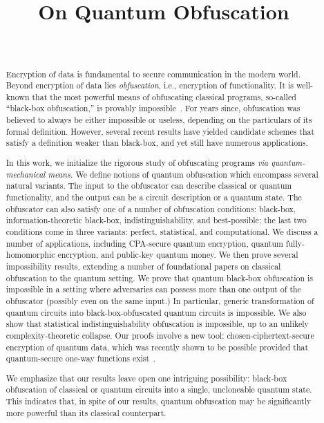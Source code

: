 \documentclass[envcountsame]{llncs}
\title{On Quantum Obfuscation}
\author{~}
\institute{~}
\numberwithin{equation}{section}
\begin{document}
\mainmatter


\maketitle
\thispagestyle{plain}

\begin{abstract}
Encryption of data is fundamental to secure communication in the modern world. Beyond encryption of data lies \emph{obfuscation}, i.e., encryption of functionality. It is well-known that the most powerful means of obfuscating classical programs, so-called ``black-box obfuscation,'' is provably impossible~\cite{BGIRSVY01}. For years since, obfuscation was believed to always be either impossible or useless, depending on the particulars of its formal definition. However, several recent results have yielded candidate schemes that satisfy a definition weaker than black-box, and yet still have numerous applications.

In this work, we initialize the rigorous study of obfuscating programs \emph{via quantum-mechanical means.} We define notions of quantum obfuscation which encompass several natural variants. The input to the obfuscator can describe classical or quantum functionality, and the output can be a circuit description or a quantum state. The obfuscator can also satisfy one of a number of obfuscation conditions: black-box, information-theoretic black-box, indistinguishability, and best-possible; the last two conditions come in three variants: perfect, statistical, and computational. We discuss a number of applications, including CPA-secure quantum encryption, quantum fully-homomorphic encryption, and public-key quantum money. We then prove several impossibility results, extending a number of foundational papers on classical obfuscation to the quantum setting. We prove that quantum black-box obfuscation is impossible in a setting where adversaries can possess more than one output of the obfuscator (possibly even on the same input.) In particular, generic transformation of quantum circuits into black-box-obfuscated quantum circuits is impossible. We also show that statistical indistinguishability obfuscation is impossible, up to an unlikely complexity-theoretic collapse. Our proofs involve a new tool: chosen-ciphertext-secure encryption of quantum data, which was recently shown to be possible provided that quantum-secure one-way functions exist~\cite{ABFGSS16}. 

We emphasize that our results leave open one intriguing possibility: black-box obfuscation of classical or quantum circuits into a single, uncloneable  quantum state. This indicates that, in spite of our results, quantum obfuscation may be significantly more powerful than its classical counterpart.
\end{abstract}
\end{document}
